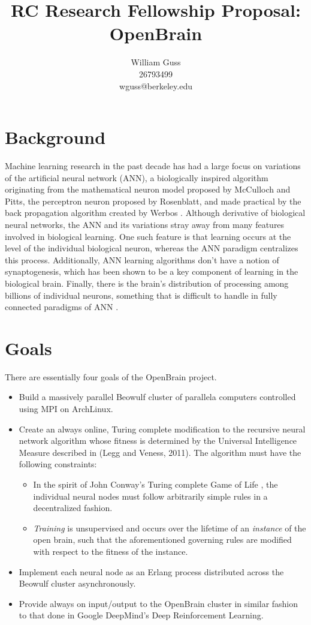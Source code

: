 \documentclass[letter]{article}
\title{RC Research Fellowship Proposal: OpenBrain}
\author{William Guss\\26793499\\wguss@berkeley.edu}
\begin{document}
\maketitle
\thispagestyle{empty}


\section{Background}
Machine learning research in the past decade has had a large focus on variations of the artificial neural network (ANN),
a biologically inspired algorithm originating from the mathematical neuron model proposed by McCulloch and Pitts\cite{mcpitts},
the perceptron neuron proposed by Rosenblatt\cite{perceptron}, and made practical by the back propagation algorithm created by Werbos \cite{bprop}.
Although derivative of biological neural networks, the ANN and its variations stray away from many features involved in biological learning. One
such feature is that learning occurs at the level of the individual biological neuron, whereas the ANN paradigm centralizes this process.
Additionally, ANN learning algorithms don't have a notion of synaptogenesis, which has been shown to be a key component of learning in the biological
brain\cite{gene}. Finally, there is the brain's distribution of processing among billions of individual neurons, something that is difficult to handle
in fully connected paradigms of ANN \cite{annbook}.

\section{Goals}
There are essentially four goals of the OpenBrain project.
\begin{itemize}
\item Build a massively parallel Beowulf cluster of parallela computers controlled using MPI on ArchLinux.
\item Create an always online, Turing complete modification to the recursive neural network algorithm whose fitness
is determined by the Universal Intelligence Measure described in (Legg and Veness, 2011). The algorithm must have the
following constraints:
    \begin{itemize}
        \item In the spirit of John Conway's Turing complete Game of Life \cite{conway}, the individual neural nodes must follow
         arbitrarily simple rules in a decentralized fashion.
        \item \emph{Training} is unsupervised and occurs over the lifetime of an \emph{instance} of the open brain,
        such that the aforementioned governing rules are modified with respect to the fitness of the instance.
    \end{itemize}
\item Implement each neural node as an Erlang process distributed across the Beowulf cluster asynchronously.
\item Provide always on input/output to the OpenBrain cluster in similar fashion to that done in Google DeepMind's
  Deep Reinforcement Learning.
\end{itemize}
\end{document}
